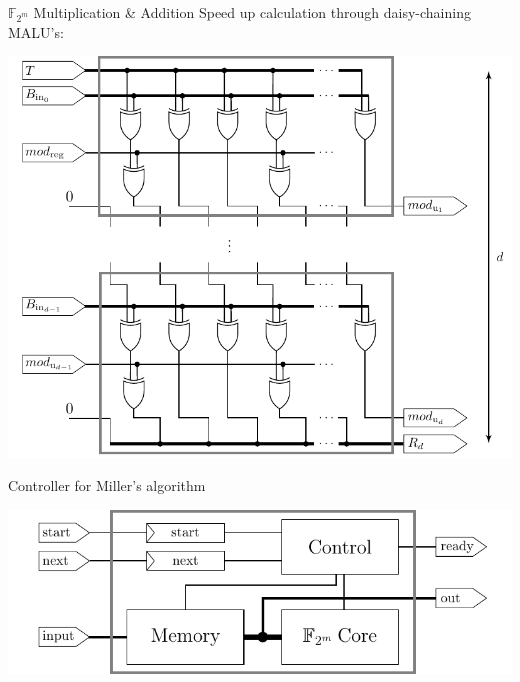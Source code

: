 \documentclass[svgnames, handout,t]{beamer}
\newenvironment{changemargin}[2]{%
\begin{list}{}{%
\setlength{\topsep}{0pt}%
\setlength{\leftmargin}{#1}%
\setlength{\rightmargin}{#2}%
\setlength{\listparindent}{\parindent}%
\setlength{\itemindent}{\parindent}%
\setlength{\parsep}{\parskip}%
}%
\item[]}{\end{list}}
\begin{document}
\begin{frame}{$\mathbb{F}_{2^m}$ Multiplication \& Addition}
	Speed up calculation through daisy-chaining MALU's:\\[0.7em]
	\begin{changemargin}{-1cm}{-1cm}
	\begin{center}\includegraphics[height=0.6\paperheight]{images/malu-width-d}\end{center}
	\end{changemargin}
\end{frame}

\begin{frame}{Controller for Miller's algorithm}
\vfill
	\begin{changemargin}{-4cm}{-4cm}
		\begin{center}\includegraphics[width=1\paperwidth]{images/controller-miller}\end{center}
	\end{changemargin}
\vfill
\end{frame}
\end{document}
